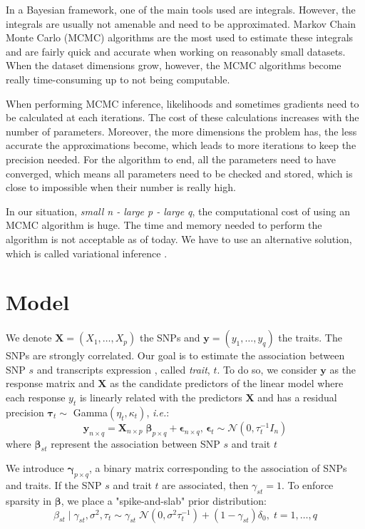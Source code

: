 \documentclass{article}
\numberwithin{equation}{section}
\begin{document}
In a Bayesian framework, one of the main tools used are integrals. However, the integrals are usually not amenable and need to be approximated. Markov Chain Monte Carlo (MCMC) algorithms are the most used to estimate these integrals and are fairly quick and accurate when working on reasonably small datasets. When the dataset dimensions grow, however, the MCMC algorithms become really time-consuming up to not being computable.

When performing MCMC inference, likelihoods and sometimes gradients need to be calculated at each iterations. The cost of these calculations increases with the number of parameters. Moreover, the more dimensions the problem has, the less accurate the approximations become, which leads to more iterations to keep the precision needed. For the algorithm to end, all the parameters need to have converged, which means all parameters need to be checked and stored, which is close to impossible when their number is really high.

In our situation, \textit{small n - large p - large q}, the computational cost of using an MCMC algorithm is huge. The time and memory needed to perform the algorithm is not acceptable as of today. We have to use an alternative solution, which is called variational inference \cite{varInf}.
\newpage
\section{Model}
We denote $\boldsymbol{X }= (X_1,\ldots,X_p)$ the SNPs and $\boldsymbol{y} = (y_1,\ldots,y_q)$ the traits. The SNPs are strongly correlated. Our goal is to estimate the association between SNP $s$ and transcripts expression , called \textit{trait}, $t$. To do so, we consider $\boldsymbol{y}$ as the response matrix and $\boldsymbol{X}$ as the candidate predictors of the linear model where each response $y_t$ is linearly related with the predictors $\boldsymbol{X}$ and has a residual precision $\boldsymbol{\tau}_t\sim$ Gamma$(\eta_t,\kappa_t)$, \textit{i.e.}:
\begin{equation*}
\label{eq:model}
\boldsymbol{y}_{n\times q} = \boldsymbol{X}_{n \times p}\;\boldsymbol{\beta}_{p \times q}+\boldsymbol{\epsilon}_{n \times q}\text{, }\boldsymbol{\epsilon}_t \sim \mathcal{N}(0,\tau_t^{-1}I_n)
\end{equation*}
where $\boldsymbol{\beta}_{st}$ represent the association between SNP $s$ and trait $t$

We introduce $\boldsymbol{\gamma}_{p\times q}$, a binary matrix corresponding to the association of SNPs and traits. If the SNP $s$ and trait $t$ are associated, then $\gamma_{st} = 1$. To enforce sparsity in $\boldsymbol{\beta}$, we place a "spike-and-slab" prior distribution:
\begin{equation*}
\beta_{st} \mid \gamma_{st},\sigma^2, \tau_t \sim \gamma_{st}\;\mathcal{N}(0,\sigma^2\tau_t^{-1})+(1-\gamma_{st})\delta_0,\;t=1,\ldots,q
\end{equation*}
 
\end{document}
